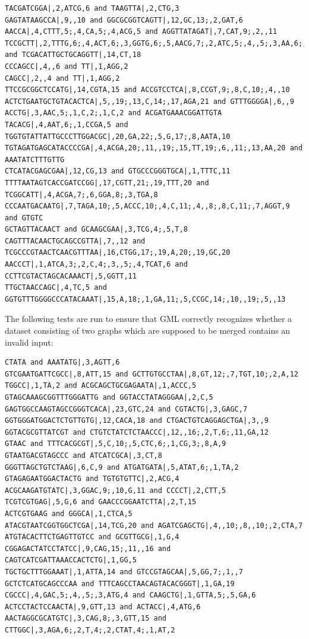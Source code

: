 \documentclass[a4paper,12pt,twoside,BCOR=10mm]{scrbook}
\begin{document}
\begin{lstlisting}
TACGATCGGA|,2,ATCG,6 and TAAGTTA|,2,CTG,3
GAGTATAAGCCA|,9,,10 and GGCGCGGTCAGTT|,12,GC,13;,2,GAT,6
AACCA|,4,CTTT,5;,4,CA,5;,4,ACG,5 and AGGTTATAGAT|,7,CAT,9;,2,,11
TCCGCTT|,2,TTTG,6;,4,ACT,6;,3,GGTG,6;,5,AACG,7;,2,ATC,5;,4,,5;,3,AA,6;,3,GGA,7 and TCGACATTGCTGCAGGTT|,14,CT,18
CCCAGCC|,4,,6 and TT|,1,AGG,2
CAGCC|,2,,4 and TT|,1,AGG,2
TTCCGCGGCTCCATG|,14,CGTA,15 and ACCGTCCTCA|,8,CCGT,9;,8,C,10;,4,,10
ACTCTGAATGCTGTACACTCA|,5,,19;,13,C,14;,17,AGA,21 and GTTTGGGGA|,6,,9
ACCTG|,3,AAC,5;,1,C,2;,1,C,2 and ACGATGAAACGGATTGTA
TACACG|,4,AAT,6;,1,CCGA,5 and TGGTGTATTATTGCCCTTGGACGC|,20,GA,22;,5,G,17;,8,AATA,10
TGTAGATGAGCATACCCCGA|,4,ACGA,20;,11,,19;,15,TT,19;,6,,11;,13,AA,20 and AAATATCTTTGTTG
CTCATACGAGCGAA|,12,CG,13 and GTGCCCGGGTGCA|,1,TTTC,11
TTTTAATAGTCACCGATCCGG|,17,CGTT,21;,19,TTT,20 and TCGGCATT|,4,ACGA,7;,6,GGA,8;,3,TGA,8
CCCAATGACAATG|,7,TAGA,10;,5,ACCC,10;,4,C,11;,4,,8;,8,C,11;,7,AGGT,9 and GTGTC
GCTAGTTACAACT and GCAAGCGAA|,3,TCG,4;,5,T,8
CAGTTTACAACTGCAGCCGTTA|,7,,12 and TCGCCCGTAACTCAACGTTTAA|,16,CTGG,17;,19,A,20;,19,GC,20
AACCCT|,1,ATCA,3;,2,C,4;,3,,5;,4,TCAT,6 and CCTTCGTACTAGCACAAACT|,5,GGTT,11
TTGCTAACCAGC|,4,TC,5 and GGTGTTTGGGGCCCATACAAAT|,15,A,18;,1,GA,11;,5,CCGC,14;,10,,19;,5,,13
\end{lstlisting}

The following tests are run to ensure that GML correctly recognizes whether a dataset 
consisting of two graphs which are supposed to be merged contains an invalid input:

\begin{lstlisting}
CTATA and AAATATG|,3,AGTT,6
GTCGAATGATTCGCC|,8,ATT,15 and GCTTGTGCCTAA|,8,GT,12;,7,TGT,10;,2,A,12
TGGCC|,1,TA,2 and ACGCAGCTGCGAGAATA|,1,ACCC,5
GTAGCAAAGCGGTTTGGGATTG and GGTACCTATAGGGAA|,2,C,5
GAGTGGCCAAGTAGCCGGGTCACA|,23,GTC,24 and CGTACTG|,3,GAGC,7
GGTGGGATGGACTCTGTTGTG|,12,CACA,18 and CTGACTGTCAGGAGCTGA|,3,,9
GGTACGCGTTATCGT and CTGTCTATCTCTAACCC|,12,,16;,2,T,6;,11,GA,12
GTAAC and TTTCACGCGT|,5,C,10;,5,CTC,6;,1,CG,3;,8,A,9
GTAATGACGTAGCCC and ATCATCGCA|,3,CT,8
GGGTTAGCTGTCTAAG|,6,C,9 and ATGATGATA|,5,ATAT,6;,1,TA,2
GTAGAGAATGGACTACTG and TGTGTGTTC|,2,ACG,4
ACGCAAGATGTATC|,3,GGAC,9;,10,G,11 and CCCCT|,2,CTT,5
TCGTCGTGAG|,5,G,6 and GAACCCGGAATCTTA|,2,T,15
ACTCGTGAAG and GGGCA|,1,CTCA,5
ATACGTAATCGGTGGCTCGA|,14,TCG,20 and AGATCGAGCTG|,4,,10;,8,,10;,2,CTA,7
ATGTACACTTCTGAGTTGTCC and GCGTTGCG|,1,G,4
CGGAGACTATCCTATCC|,9,CAG,15;,11,,16 and CAGTCATCGATTAAACCACTCTG|,1,GG,5
TGCTGCTTTGGAAAT|,1,ATTA,14 and GTCCGTAGCAA|,5,GG,7;,1,,7
GCTCTCATGCAGCCCAA and TTTCAGCCTAACAGTACACGGGT|,1,GA,19
CGCCC|,4,GAC,5;,4,,5;,3,ATG,4 and CAAGCTG|,1,GTTA,5;,5,GA,6
ACTCCTACTCCAACTA|,9,GTT,13 and ACTACC|,4,ATG,6
AACTAGGCGCATGTC|,3,CAG,8;,3,GTT,15 and CTTGGC|,3,AGA,6;,2,T,4;,2,CTAT,4;,1,AT,2
\end{lstlisting}
\end{document}
